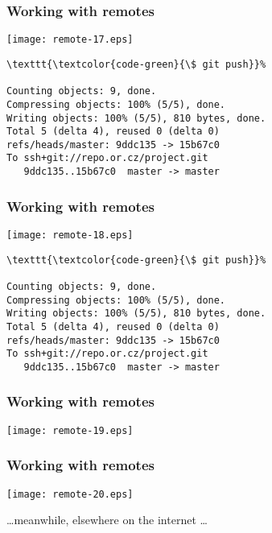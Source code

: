 \documentclass[english]{beamer}
\newcommand{\CMD}[1]{%
\texttt{\textcolor{code-green}{#1}}%
}
\begin{document}
\begin{frame}[fragile]
\frametitle{Working with remotes}

\texttt{[image: remote-17.eps]}

{\tiny
\begin{Verbatim}[commandchars=\\\{\}]
\CMD{\$ git push}
Counting objects: 9, done.
Compressing objects: 100% (5/5), done.
Writing objects: 100% (5/5), 810 bytes, done.
Total 5 (delta 4), reused 0 (delta 0)
refs/heads/master: 9ddc135 -> 15b67c0
To ssh+git://repo.or.cz/project.git
   9ddc135..15b67c0  master -> master
\end{Verbatim}
}
\vspace{\textheight}
\end{frame}

\begin{frame}[fragile]
\frametitle{Working with remotes}

\texttt{[image: remote-18.eps]}

{\tiny
\begin{Verbatim}[commandchars=\\\{\}]
\CMD{\$ git push}
Counting objects: 9, done.
Compressing objects: 100% (5/5), done.
Writing objects: 100% (5/5), 810 bytes, done.
Total 5 (delta 4), reused 0 (delta 0)
refs/heads/master: 9ddc135 -> 15b67c0
To ssh+git://repo.or.cz/project.git
   9ddc135..15b67c0  master -> master
\end{Verbatim}
}
\vspace{\textheight}
\end{frame}

\begin{frame}[fragile]
\frametitle{Working with remotes}

\texttt{[image: remote-19.eps]}

\vspace{\textheight}
\end{frame}

\begin{frame}[fragile]
\frametitle{Working with remotes}

\texttt{[image: remote-20.eps]}

\begin{center}
\ldots meanwhile, elsewhere on the internet \ldots
\end{center}

\vspace{\textheight}
\end{frame}
\end{document}
